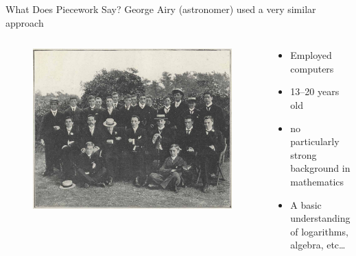 \documentclass[presentation]{subfiles}
\begin{document}
\begin{frame}[t]{What Does Piecework Say?}
      George Airy (astronomer) used a very similar approach\par
      \scriptsize{\textcite{grier2013computers}\par}\normalsize{}
    \begin{columns}
    \begin{column}{0.6\textwidth}
      \begin{figure}
        \includegraphics[max width=\textwidth, max height=.7\textheight,keepaspectratio]{figures/photo/Greenwich-Observatory-computing-staff-1902.jpg}
      \end{figure}
    \end{column}
    
    \begin{column}{0.4\textwidth}
      \begin{itemize}
        \item Employed computers
        \item 13--20 years old
        \item no particularly strong background in mathematics
        \item A basic understanding of logarithms, algebra, etc\dots
      \end{itemize}
    \end{column}
    \end{columns}

\end{frame}
\end{document}
